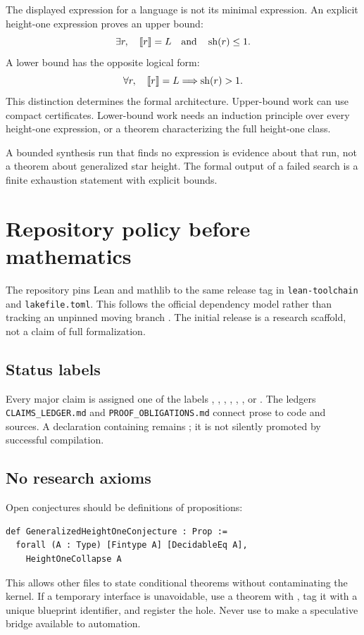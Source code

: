 \documentclass{amsart}
\begin{document}
The displayed expression for a language is not its minimal expression.  An explicit height-one expression proves an upper bound:
\[
  \exists r,\quad \llbracket r\rrbracket=L\quad\text{and}\quad \operatorname{sh}(r)\leq 1.
\]
A lower bound has the opposite logical form:
\[
  \forall r,\quad \llbracket r\rrbracket=L\Longrightarrow \operatorname{sh}(r)>1.
\]
This distinction determines the formal architecture.  Upper-bound work can use compact certificates.  Lower-bound work needs an induction principle over every height-one expression, or a theorem characterizing the full height-one class.

\begin{warning}
A bounded synthesis run that finds no expression is evidence about that run, not a theorem about generalized star height.  The formal output of a failed search is a finite exhaustion statement with explicit bounds.
\end{warning}

\section{Repository policy before mathematics}

The repository pins Lean and mathlib to the same release tag in \nolinkurl{lean-toolchain} and \nolinkurl{lakefile.toml}.  This follows the official dependency model rather than tracking an unpinned moving branch \cite{leanReleaseNotes2026,mathlibDependency2026}.  The initial release is a research scaffold, not a claim of full formalization.

\subsection{Status labels}

Every major claim is assigned one of the labels , , , , , , or .  The ledgers \nolinkurl{CLAIMS_LEDGER.md} and \nolinkurl{PROOF_OBLIGATIONS.md} connect prose to code and sources.  A declaration containing  remains ; it is not silently promoted by successful compilation.

\subsection{No research axioms}

Open conjectures should be definitions of propositions:
\begin{lstlisting}[language={}]
def GeneralizedHeightOneConjecture : Prop :=
  forall (A : Type) [Fintype A] [DecidableEq A],
    HeightOneCollapse A
\end{lstlisting}
This allows other files to state conditional theorems without contaminating the kernel.  If a temporary interface is unavoidable, use a theorem with , tag it with a unique blueprint identifier, and register the hole.  Never use  to make a speculative bridge available to automation.
\end{document}
